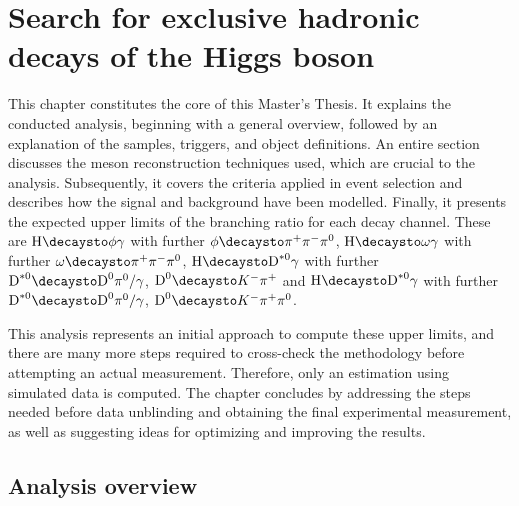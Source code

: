 \chapter[Search for exclusive hadronic decays of the Higgs boson]{Search for exclusive hadronic decays of the Higgs boson}\label{chap:analysis}

This chapter constitutes the core of this Master's Thesis. It explains the conducted analysis, beginning with a general overview, followed by an explanation of the samples, triggers, and object definitions. An entire section discusses the meson reconstruction techniques used, which are crucial to the analysis. Subsequently, it covers the criteria applied in event selection and describes how the signal and background have been modelled. Finally, it presents the expected upper limits of the branching ratio for each decay channel. These are $\text{H}\decaysto \phi\gamma$ with further $\phi\decaysto \pi^+\pi^-\pi^0$, $\text{H}\decaysto \omega\gamma$ with further $\omega\decaysto \pi^+\pi^-\pi^0$, $\text{H}\decaysto \text{D}^{*0}\gamma$ with further $\text{D}^{*0}\decaysto \text{D}^{0}\pi^{0}/\gamma$, $\text{D}^{0}\decaysto K^{-}\pi^{+}$ and $\text{H}\decaysto \text{D}^{*0}\gamma$ with further $\text{D}^{*0}\decaysto \text{D}^{0}\pi^{0}/\gamma$, $\text{D}^{0}\decaysto K^{-}\pi^{+}\pi^{0}$.

This analysis represents an initial approach to compute these upper limits, and there are many more steps required to cross-check the methodology before attempting an actual measurement. Therefore, only an estimation using simulated data is computed. The chapter concludes by addressing the steps needed before data unblinding and obtaining the final experimental measurement, as well as suggesting ideas for optimizing and improving the results.

\section{Analysis overview}\label{sec:analysis_overview}

